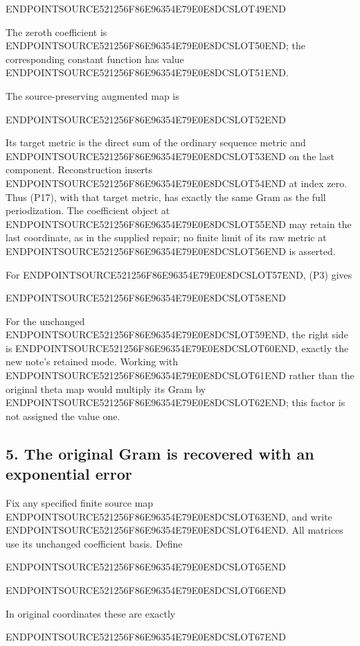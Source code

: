 ENDPOINTSOURCE521256F86E96354E79E0E8DCSLOT49END

The zeroth coefficient is ENDPOINTSOURCE521256F86E96354E79E0E8DCSLOT50END; the corresponding constant function has value ENDPOINTSOURCE521256F86E96354E79E0E8DCSLOT51END.

The source-preserving augmented map is

ENDPOINTSOURCE521256F86E96354E79E0E8DCSLOT52END

Its target metric is the direct sum of the ordinary sequence metric and ENDPOINTSOURCE521256F86E96354E79E0E8DCSLOT53END on the last component. Reconstruction inserts ENDPOINTSOURCE521256F86E96354E79E0E8DCSLOT54END at index zero. Thus (P17), with that target metric, has exactly the same Gram as the full periodization. The coefficient object at ENDPOINTSOURCE521256F86E96354E79E0E8DCSLOT55END may retain the last coordinate, as in the supplied repair; no finite limit of its raw metric at ENDPOINTSOURCE521256F86E96354E79E0E8DCSLOT56END is asserted.

For ENDPOINTSOURCE521256F86E96354E79E0E8DCSLOT57END, (P3) gives

ENDPOINTSOURCE521256F86E96354E79E0E8DCSLOT58END

For the unchanged ENDPOINTSOURCE521256F86E96354E79E0E8DCSLOT59END, the right side is ENDPOINTSOURCE521256F86E96354E79E0E8DCSLOT60END, exactly the new note's retained mode. Working with ENDPOINTSOURCE521256F86E96354E79E0E8DCSLOT61END rather than the original theta map would multiply its Gram by ENDPOINTSOURCE521256F86E96354E79E0E8DCSLOT62END; this factor is not assigned the value one.

\subsection{5. The original Gram is recovered with an exponential error}\label{endpoint-periodized_original--the-original-gram-is-recovered-with-an-exponential-error}

Fix any specified finite source map ENDPOINTSOURCE521256F86E96354E79E0E8DCSLOT63END, and write ENDPOINTSOURCE521256F86E96354E79E0E8DCSLOT64END. All matrices use its unchanged coefficient basis. Define

ENDPOINTSOURCE521256F86E96354E79E0E8DCSLOT65END

ENDPOINTSOURCE521256F86E96354E79E0E8DCSLOT66END

In original coordinates these are exactly

ENDPOINTSOURCE521256F86E96354E79E0E8DCSLOT67END

